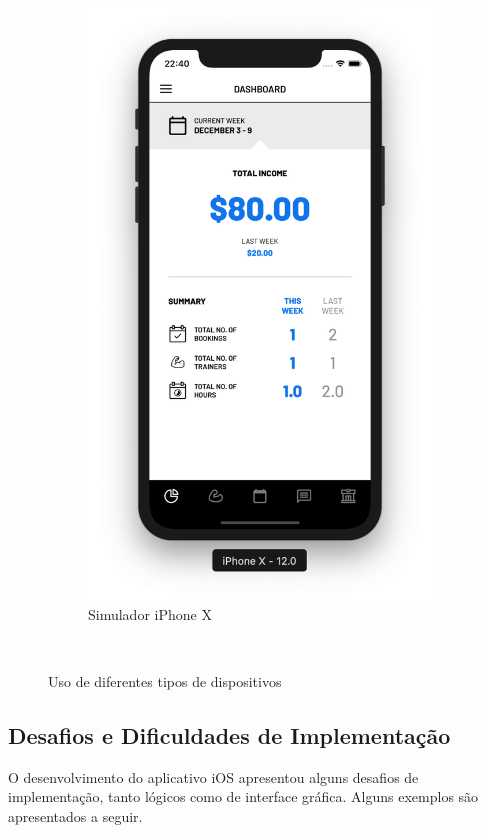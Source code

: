 \begin{figure}[H]
\begin{subfigure}[b]{0.3\textwidth}
        \includegraphics[width=\textwidth]{pfc/figuras/x.png}
        \caption{Simulador iPhone X}
        \label{fig:x}
    \end{subfigure}
    ~
    \caption{Uso de diferentes tipos de dispositivos}
    \label{fig:devices}
\end{figure}

\subsection{Desafios e Dificuldades de Implementação}
O desenvolvimento do aplicativo iOS apresentou alguns desafios de implementação, tanto lógicos como de interface gráfica. Alguns exemplos são apresentados a seguir.

